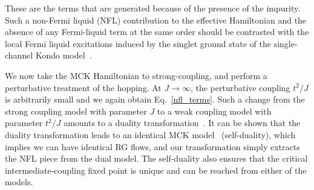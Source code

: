 \documentclass[reprint,prb,superscriptaddress]{revtex4-2}
\begin{document}
These are the terms that are generated because of the presence of the impurity. Such a non-Fermi liquid (NFL) contribution to the effective Hamiltonian and the absence of any Fermi-liquid term at the same order should be contrasted with the local Fermi liquid excitations induced by the singlet ground state of the single-channel Kondo model~\cite{nozieres1974fermi,wilson1975renormalization,hewson1993}. 

We now take the MCK Hamiltonian to strong-coupling, and perform a perturbative treatment of the hopping. At \(J \to \infty\), the perturbative coupling \(t^2/J\) is arbitrarily small and we again obtain Eq.~\ref{nfl_terms}. Such a change from the strong coupling model with parameter \(J\) to a weak coupling model with parameter \(t^2/J\) amounts to a duality transformation~\cite{kroha_kolf_2007,zitko_fabrizio_2017}. It can be shown that the duality transformation leads to an identical MCK model~\cite{kroha_kolf_2007} (self-duality), which implies we can have identical RG flows, and our transformation simply extracts the NFL piece from the dual model. The self-duality also ensures that the critical intermediate-coupling fixed point is unique and can be reached from either of the models.
\end{document}
